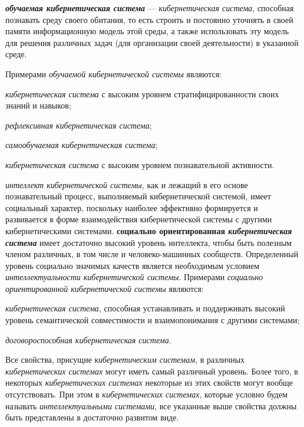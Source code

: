 \textbf{\textit{обучаемая кибернетическая система}} --- \textit{кибернетическая система}, способная познавать среду своего обитания, то есть строить и постоянно уточнять в своей памяти информационную модель этой среды, а также использовать эту модель для решения различных задач (для организации своей деятельности) в указанной среде. 

Примерами \textit{обучаемой кибернетической системы} являются:
\begin{textitemize}
    \item \textit{кибернетическая система} с высоким уровнем стратифицированности своих знаний и навыков;
    \item \textit{рефлексивная кибернетическая система};
    \item \textit{самообучаемая кибернетическая система};
    \item \textit{кибернетическая система} с высоким уровнем познавательной активности.
\end{textitemize}

\textit{интеллект кибернетической системы}, как и лежащий в его основе познавательный процесс, выполняемый кибернетической системой, имеет социальный характер, поскольку наиболее эффективно формируется и развивается в форме взаимодействия кибернетической системы с другими кибернетическими системами.
\textbf{социально ориентированная \textit{кибернетическая система}} имеет достаточно высокий уровень интеллекта, чтобы быть полезным членом различных, в том числе и человеко-машинных сообществ. Определенный уровень социально значимых качеств является необходимым условием \textit{интеллектуальности кибернетической системы}.
Примерами \textit{социально ориентированной кибернетической системы} являются:
\begin{textitemize}
    \item \textit{кибернетическая система}, способная устанавливать и поддерживать высокий уровень семантической совместимости и взаимопонимания с другими системами;
    \item \textit{договороспособная кибернетическая система}.
\end{textitemize}

Все свойства, присущие \textit{кибернетическим системам}, в различных \textit{кибернетических системах} могут иметь самый различный уровень. Более того, в некоторых \textit{кибернетических системах} некоторые из этих свойств могут вообще отсутствовать.
При этом в \textit{кибернетических системах}, которые условно будем называть \textit{интеллектуальными системами}, все указанные выше свойства должны быть представлены в достаточно развитом виде.